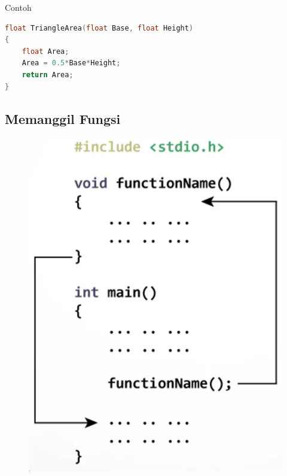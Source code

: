Contoh

\begin{lstlisting}[language=c]
float TriangleArea(float Base, float Height)
{
	float Area;
	Area = 0.5*Base*Height;
	return Area;
}
\end{lstlisting}


\subsection{Memanggil Fungsi}

\begin{figure}[H]
    \centering
    \includegraphics[width=0.45\linewidth]{P3/img/screenshot005.png}
    \caption{}
    \label{fig:memanggilfungsi}
\end{figure}

